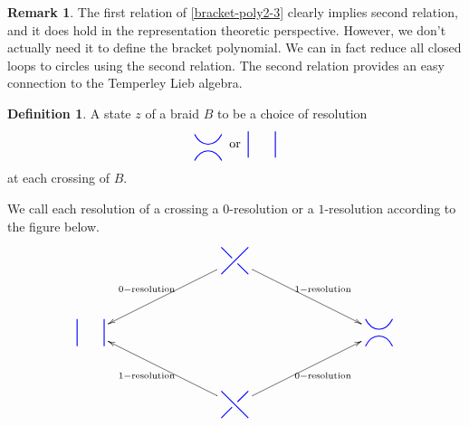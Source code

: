 \documentclass{amsart}
\newcommand{\hackcenter}[1]{
 \xy (0,0)*{#1}; \endxy}
\theoremstyle{plain}
\theoremstyle{definition}
\newtheorem{definition}[theorem]{Definition}
\theoremstyle{definition}
\newtheorem{remark}[theorem]{Remark}
\numberwithin{equation}{section}
\numberwithin{theorem}{section}
\numberwithin{equation}{section}
\begin{document}
\begin{remark}\label{rmk:closed-loops}
  The first relation of \eqref{bracket-poly2-3} clearly implies second relation, and it does hold in the representation theoretic perspective.
  However, we don't actually need it to define the bracket polynomial.
  We can in fact reduce all closed loops to circles using the second relation. The second relation provides an easy connection to the Temperley Lieb algebra.
\end{remark}


\begin{definition}\label{def:state}
A state $z$ of a braid $B$ to be a choice of resolution
\begin{align*}
  \hackcenter{ \begin{tikzpicture} [scale=.75]
\draw[thick,   blue] (0,0).. controls ++(.25,.5) and ++(-.25,.5).. (1,0);
\draw[thick,   blue] (0,1).. controls ++(.25,-.5) and ++(-.25,-.5).. (1,1);
\end{tikzpicture}}
\;\; \text{or} \;\;
\hackcenter{ \begin{tikzpicture} [scale=.75]
\draw[thick,   blue] (0,0) to (0,1);
\draw[thick,   blue] (1,0) to (1,1);
\end{tikzpicture}}
\end{align*}
at each crossing of $B$.
\end{definition}

We call each resolution of a crossing a $0$-resolution or a $1$-resolution according to the figure below.
\[
\xy
  (0,20)*+{ \hackcenter{ \begin{tikzpicture} [scale=.75]
\draw[thick,   blue] (0,0) to (1,1);
\draw[thick,   blue] (1,0) to (.6,.4);
\draw[thick,   blue] (0,1) to (.4,.6);
\end{tikzpicture}}}="T";
  (0,-20)*+{ \hackcenter{ \begin{tikzpicture} [xscale=-1,scale=.75]
\draw[thick,   blue] (0,0) to (1,1);
\draw[thick,   blue] (1,0) to (.6,.4);
\draw[thick,   blue] (0,1) to (.4,.6);
\end{tikzpicture}}}="B";
  (-40,0)*+{ \hackcenter{ \begin{tikzpicture} [scale=.75]
\draw[thick,   blue] (0,0) to (0,1);
\draw[thick,   blue] (1,0) to (1,1);
\end{tikzpicture}}
 }="L";
  (40,0)*+{\hackcenter{ \begin{tikzpicture} [scale=.75]
\draw[thick,   blue] (0,0).. controls ++(.25,.5) and ++(-.25,.5).. (1,0);
\draw[thick,   blue] (0,1).. controls ++(.25,-.5) and ++(-.25,-.5).. (1,1);
\end{tikzpicture}} }="R";
  {\ar_-{0-\text{resolution}} "T";"L"};
  {\ar^-{1-\text{resolution}} "T";"R"};
  {\ar^-{1-\text{resolution}} "B";"L"};
  {\ar_-{0-\text{resolution}} "B";"R"};
\endxy
\]
\end{document}
